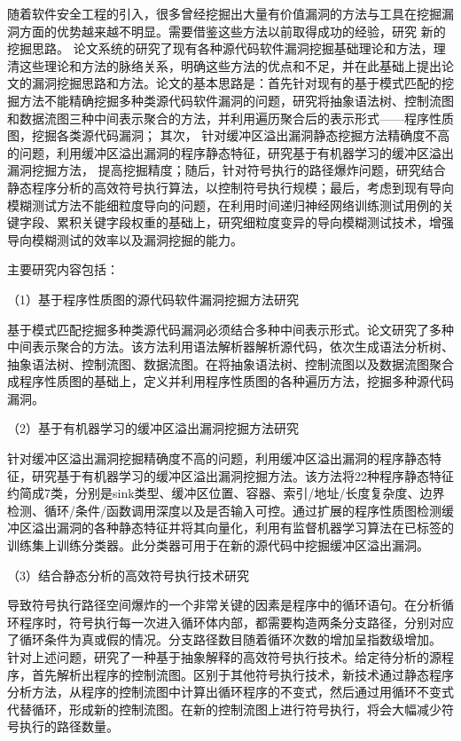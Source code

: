 随着软件安全工程的引入，很多曾经挖掘出大量有价值漏洞的方法与工具在挖掘漏洞方面的优势越来越不明显。需要借鉴这些方法以前取得成功的经验，研究
新的挖掘思路。
论文系统的研究了现有各种源代码软件漏洞挖掘基础理论和方法，理清这些理论和方法的脉络关系，明确这些方法的优点和不足，并在此基础上提出论文的漏洞挖掘思路和方法。论文的基本思路是：首先针对现有的基于模式匹配的挖掘方法不能精确挖掘多种类源代码软件漏洞的问题，研究将抽象语法树、控制流图和数据流图三种中间表示聚合的方法，并利用遍历聚合后的表示形式——程序性质图，挖掘各类源代码漏洞；
其次，
针对缓冲区溢出漏洞静态挖掘方法精确度不高的问题，利用缓冲区溢出漏洞的程序静态特征，研究基于有机器学习的缓冲区溢出漏洞挖掘方法，
提高挖掘精度；随后，针对符号执行的路径爆炸问题，研究结合静态程序分析的高效符号执行算法，以控制符号执行规模；最后，考虑到现有导向模糊测试方法不能细粒度导向的问题，在利用时间递归神经网络训练测试用例的关键字段、累积关键字段权重的基础上，研究细粒度变异的导向模糊测试技术，增强导向模糊测试的效率以及漏洞挖掘的能力。

主要研究内容包括：

（1）基于程序性质图的源代码软件漏洞挖掘方法研究

基于模式匹配挖掘多种类源代码漏洞必须结合多种中间表示形式。论文研究了多种中间表示聚合的方法。该方法利用语法解析器解析源代码，依次生成语法分析树、抽象语法树、控制流图、数据流图。在将抽象语法树、控制流图以及数据流图聚合成程序性质图的基础上，定义并利用程序性质图的各种遍历方法，挖掘多种源代码漏洞。

（2）基于有机器学习的缓冲区溢出漏洞挖掘方法研究

针对缓冲区溢出漏洞挖掘精确度不高的问题，利用缓冲区溢出漏洞的程序静态特征，研究基于有机器学习的缓冲区溢出漏洞挖掘方法。该方法将22种程序静态特征约简成7类，分别是sink类型、缓冲区位置、容器、索引/地址/长度复杂度、边界检测、循环/条件/函数调用深度以及是否输入可控。通过扩展的程序性质图检测缓冲区溢出漏洞的各种静态特征并将其向量化，利用有监督机器学习算法在已标签的训练集上训练分类器。此分类器可用于在新的源代码中挖掘缓冲区溢出漏洞。

（3）结合静态分析的高效符号执行技术研究

导致符号执行路径空间爆炸的一个非常关键的因素是程序中的循环语句。在分析循环程序时，符号执行每一次进入循环体内部，都需要构造两条分支路径，分别对应了循环条件为真或假的情况。分支路径数目随着循环次数的增加呈指数级增加。
针对上述问题，研究了一种基于抽象解释的高效符号执行技术。给定待分析的源程序，首先解析出程序的控制流图。区别于其他符号执行技术，新技术通过静态程序分析方法，从程序的控制流图中计算出循环程序的不变式，然后通过用循环不变式代替循环，形成新的控制流图。在新的控制流图上进行符号执行，将会大幅减少符号执行的路径数量。

